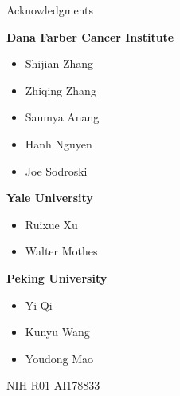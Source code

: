 \begin{frame}[fragile]{Acknowledgments}
    \begin{center}
        \begin{minipage}[t][.6\textheight]{0.45\textwidth}
            \textcolor{DUred}{\bf Dana Farber Cancer Institute}
            \begin{itemize}
                \item[] Shijian Zhang
                \item[] Zhiqing Zhang
                \item[] Saumya Anang
                \item[] Hanh Nguyen
                \item[] Joe Sodroski
            \end{itemize}
        \end{minipage}\hfill
        \begin{minipage}[t][.6\textheight]{0.45\textwidth}
            \textcolor{DUred}{\bf Yale University}
            \begin{itemize}
                \item[] Ruixue Xu
                \item[] Walter Mothes
            \end{itemize}
            \textcolor{DUred}{\bf Peking University}
            \begin{itemize}
                \item[] Yi Qi
                \item[] Kunyu Wang
                \item[] Youdong Mao
            \end{itemize}
        \end{minipage}

        \color{DUgreen!90!black}{\bf Funding:} NIH R01 AI178833
    \end{center}
\end{frame}

